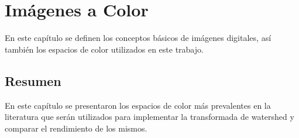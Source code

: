 \chapter{Imágenes a Color}
\label{chap:color}
En este capítulo se definen los conceptos básicos de imágenes digitales, así también los espacios de color utilizados en este trabajo. 




\section{Resumen}

En este capítulo se presentaron los espacios de color más prevalentes en la literatura que serán utilizados para implementar la transformada de watershed y comparar el rendimiento de los mismos.

